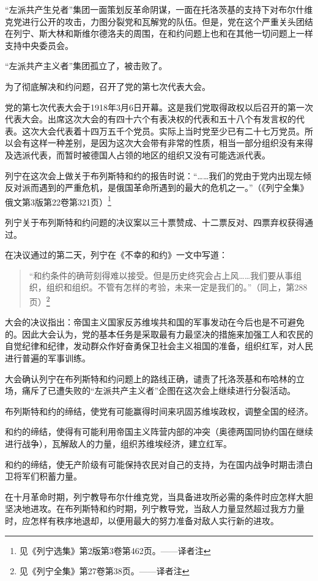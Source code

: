 “左派共产生兑者”集团一面策划反革命阴谋，一面在托洛茨基的支持下对布尔什维克党进行公开的攻击，力图分裂党和瓦解党的队伍。但是，党在这个严重关头团结在列宁、斯大林和斯维尔德洛夫的周围，在和约问题上也和在其他一切问题上一样支持中央委员会。

“左派共产主义者”集团孤立了，被击败了。

为了彻底解决和约问题，召开了党的第七次代表大会。

党的第七次代表大会于1918年3月6日开幕。这是我们党取得政权以后召开的第一次代表大会。出席这次大会的有四十六个有表决权的代表和五十八个有发言权的代表。这次大会代表着十四万五千个党员。实际上当时党至少已有二十七万党员。所以会有这样一种差别，是因为这次大会带有非常的性质，相当一部分组织没有来得及选派代表，而暂时被德国人占领的地区的组织又没有可能选派代表。

列宁在这次会上做关于布列斯特和约的报告时说：“……我们的党由于党内出现左倾反对派而遇到的严重危机，是俄国革命所遇到的最大的危机之一。”（《列宁全集》俄文第3版第22卷第321页）\footnote{见《列宁选集》第2版第3卷第462页。——译者注}

列宁关于布列斯特和约问题的决议案以三十票赞成、十二票反对、四票弃权获得通过。

在决议通过的第二天，列宁在《不幸的和约》一文中写道：

\begin{quotation}
“和约条件的确苛刻得难以接受。但是历史终究会占上风……我们要从事组织，组织和组织。不管有怎样的考验，未来一定是我们的。”（同上，第288页）\footnote{见《列宁全集》第27卷第38页。——译者注}
\end{quotation}

大会的决议指出：帝国主义国家反苏维埃共和国的军事发动在今后也是不可避免的。因此大会认为，党的基本任务是采取最有力最坚决的措施来加强工人和农民的自觉纪律和纪律，发动群众作好奋勇保卫社会主义祖国的准备，组织红军，对人民进行普遍的军事训练。

大会确认列宁在布列斯特和约问题上的路线正确，谴责了托洛茨基和布哈林的立场，痛斥了已遭失败的“左派共产主义者”企图在这次会上继续进行分裂活动。

布列斯特和约的缔结，使党有可能赢得时间来巩固苏维埃政权，调整全国的经济。

和约的缔结，使得有可能利用帝国主义阵营内部的冲突（奥德两国同协约国在继续进行战争），瓦解敌人的力量，组织苏维埃经济，建立红军。

和约的缔结，使无产阶级有可能保持农民对自己的支持，为在国内战争时期击溃白卫将军们积蓄力量。

在十月革命时期，列宁教导布尔什维克党，当具备进攻所必需的条件时应怎样大胆坚决地进攻。在布列斯特和约时期，列宁教导党，当敌人力量显然超过我方力量时，应怎样有秩序地退却，以便用最大的努力准备对敌人实行新的进攻。

